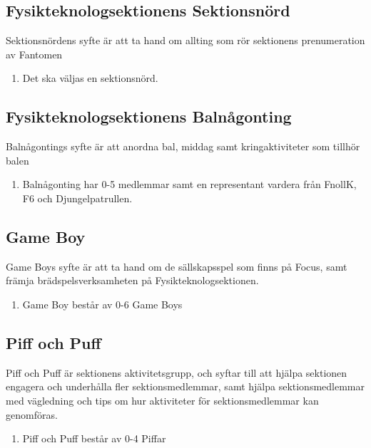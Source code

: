 \documentclass[11pt,a4paper]{article}
\begin{document}
\subsection{Fysikteknologsektionens Sektionsnörd}
Sektionsnördens syfte är att ta hand om allting som rör sektionens prenumeration av Fantomen
\begin{enumerate}[\thesubsection .1]

  \item Det ska väljas en sektionsnörd.

\end{enumerate}

\subsection{Fysikteknologsektionens Balnågonting}
Balnågontings syfte är att anordna bal, middag samt kringaktiviteter som tillhör balen
\begin{enumerate}[\thesubsection .1]

	\item Balnågonting har 0-5 medlemmar samt en representant vardera från FnollK, F6 och Djungelpatrullen.
  
\end{enumerate}

\subsection{Game Boy}
Game Boys syfte är att ta hand om de sällskapsspel som finns på Focus, samt främja
brädspelsverksamheten på Fysikteknologsektionen.
\begin{enumerate}[\thesubsection .1]

	\item Game Boy består av 0-6 Game Boys
	
\end{enumerate}

\subsection{Piff och Puff}
Piff och Puff är sektionens aktivitetsgrupp, och syftar till att hjälpa sektionen engagera och underhålla fler sektionsmedlemmar, samt hjälpa sektionsmedlemmar med vägledning och tips om hur aktiviteter för sektionsmedlemmar kan genomföras.

\begin{enumerate}[\thesubsection .1]

	\item Piff och Puff består av 0-4 Piffar
	
\end{enumerate}
\end{document}
